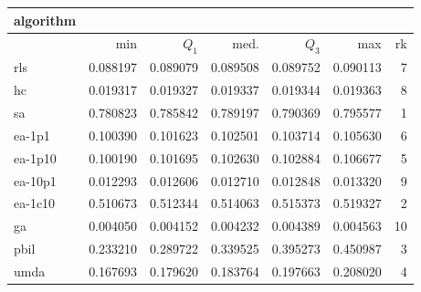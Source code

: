 \begin{tabular}{@{}l*{5}{>{{}}N{1}{3}}>{{}}N{2}{0}@{}}
\toprule
{algorithm} &  \\
\midrule
& {min} & {$Q_1$} & {med.} & {$Q_3$} & {max} & {rk}\\
\midrule
rls & 0.088197 & 0.089079 & 0.089508 & 0.089752 & 0.090113 & 7\\
hc & 0.019317 & 0.019327 & 0.019337 & 0.019344 & 0.019363 & 8\\
sa & {\color{blue}} 0.780823 & {\color{blue}} 0.785842 & {\color{blue}} 0.789197 & {\color{blue}} 0.790369 & {\color{blue}} 0.795577 & 1\\
ea-1p1 & 0.100390 & 0.101623 & 0.102501 & 0.103714 & 0.105630 & 6\\
ea-1p10 & 0.100190 & 0.101695 & 0.102630 & 0.102884 & 0.106677 & 5\\
ea-10p1 & 0.012293 & 0.012606 & 0.012710 & 0.012848 & 0.013320 & 9\\
ea-1c10 & 0.510673 & 0.512344 & 0.514063 & 0.515373 & 0.519327 & 2\\
ga & 0.004050 & 0.004152 & 0.004232 & 0.004389 & 0.004563 & 10\\
pbil & 0.233210 & 0.289722 & 0.339525 & 0.395273 & 0.450987 & 3\\
umda & 0.167693 & 0.179620 & 0.183764 & 0.197663 & 0.208020 & 4\\
\bottomrule
\end{tabular}
